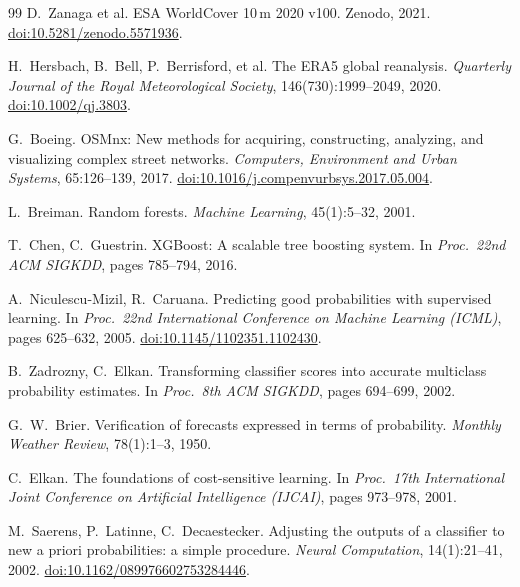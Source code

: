 \documentclass[11pt,a4paper]{article}
\begin{document}
\begin{thebibliography}{99}
D.~Zanaga et al. ESA WorldCover 10\,m 2020 v100. Zenodo, 2021.
\href{https://doi.org/10.5281/zenodo.5571936}{doi:10.5281/zenodo.5571936}.

H.~Hersbach, B.~Bell, P.~Berrisford, et al.
The ERA5 global reanalysis.
\emph{Quarterly Journal of the Royal Meteorological Society}, 146(730):1999--2049, 2020.
\href{https://doi.org/10.1002/qj.3803}{doi:10.1002/qj.3803}.

G.~Boeing.
OSMnx: New methods for acquiring, constructing, analyzing, and visualizing
complex street networks.
\emph{Computers, Environment and Urban Systems}, 65:126--139, 2017.
\href{https://doi.org/10.1016/j.compenvurbsys.2017.05.004}{doi:10.1016/j.compenvurbsys.2017.05.004}.

L.~Breiman. Random forests. \emph{Machine Learning}, 45(1):5--32, 2001.

T.~Chen, C.~Guestrin.
XGBoost: A scalable tree boosting system.
In \emph{Proc.\ 22nd ACM SIGKDD}, pages 785--794, 2016.

A.~Niculescu-Mizil, R.~Caruana.
Predicting good probabilities with supervised learning.
In \emph{Proc.\ 22nd International Conference on Machine Learning (ICML)},
pages 625--632, 2005.
\href{https://doi.org/10.1145/1102351.1102430}{doi:10.1145/1102351.1102430}.

B.~Zadrozny, C.~Elkan.
Transforming classifier scores into accurate multiclass probability estimates.
In \emph{Proc.\ 8th ACM SIGKDD}, pages 694--699, 2002.

G.~W.~Brier.
Verification of forecasts expressed in terms of probability.
\emph{Monthly Weather Review}, 78(1):1--3, 1950.

C.~Elkan.
The foundations of cost-sensitive learning.
In \emph{Proc.\ 17th International Joint Conference on Artificial Intelligence
(IJCAI)}, pages 973--978, 2001.

M.~Saerens, P.~Latinne, C.~Decaestecker.
Adjusting the outputs of a classifier to new a priori probabilities: a simple
procedure.
\emph{Neural Computation}, 14(1):21--41, 2002.
\href{https://doi.org/10.1162/089976602753284446}{doi:10.1162/089976602753284446}.


\end{thebibliography}
\end{document}
